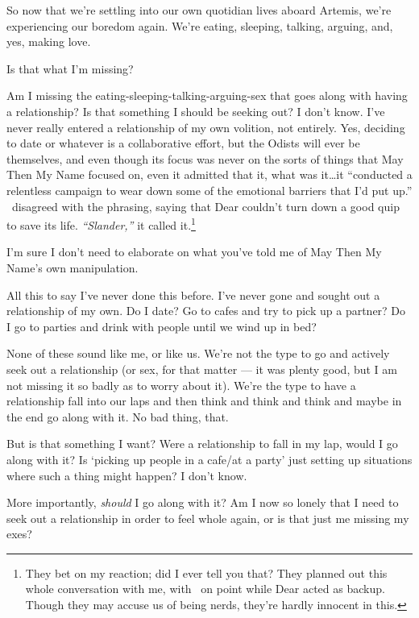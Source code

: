 So now that we're settling into our own quotidian lives aboard Artemis, we're experiencing our boredom again. We're eating, sleeping, talking, arguing, and, yes, making love.

Is that what I'm missing?

Am I missing the eating-sleeping-talking-arguing-sex that goes along with having a relationship? Is that something I should be seeking out? I don't know. I've never really entered a relationship of my own volition, not entirely. Yes, deciding to date or whatever is a collaborative effort, but the Odists will ever be themselves, and even though its focus was never on the sorts of things that May Then My Name focused on, even it admitted that it, what was it\ldots it ``conducted a relentless campaign to wear down some of the emotional barriers that I'd put up.'' \Partner\ disagreed with the phrasing, saying that Dear couldn't turn down a good quip to save its life. \emph{``Slander,''} it called it.\footnote{They bet on my reaction; did I ever tell you that? They planned out this whole conversation with me, with \Partner\ on point while Dear acted as backup. Though they may accuse us of being nerds, they're hardly innocent in this.}

I'm sure I don't need to elaborate on what you've told me of May Then My Name's own manipulation.

All this to say I've never done this before. I've never gone and sought out a relationship of my own. Do I date? Go to cafes and try to pick up a partner? Do I go to parties and drink with people until we wind up in bed?

None of these sound like me, or like us. We're not the type to go and actively seek out a relationship (or sex, for that matter — it was plenty good, but I am not missing it so badly as to worry about it). We're the type to have a relationship fall into our laps and then think and think and think and maybe in the end go along with it. No bad thing, that.

But is that something I want? Were a relationship to fall in my lap, would I go along with it? Is `picking up people in a cafe/at a party' just setting up situations where such a thing might happen? I don't know.

More importantly, \emph{should} I go along with it? Am I now so lonely that I need to seek out a relationship in order to feel whole again, or is that just me missing my exes?

